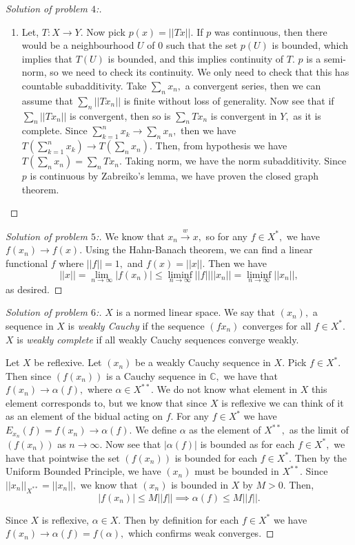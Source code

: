 \documentclass[letterpaper,11pt,twoside]{article}
\theoremstyle{proposition}
\theoremstyle{definition}
\theoremstyle{theorem}
\theoremstyle{definition}
\theoremstyle{definition}
\theoremstyle{definition}
\theoremstyle{lemma}
\theoremstyle{definition}
\theoremstyle{definition}
\theoremstyle{corollary}
\theoremstyle{definition}
\theoremstyle{definition}
\theoremstyle{definition}
\newcommand{\abs}[1]{\left \vert #1 \right \vert}
\newcommand{\norm}[1]{\left \vert \left \vert #1 \right \vert \right \vert}
\begin{document}
\begin{proof}[Solution of problem $4$:]
\begin{enumerate}
\begin{enumerate}
 		\item Let, $T:X \to Y.$ Now pick $p(x) = \norm{Tx}.$ If $p$ was continuous, then there would be a neighbourhood $U$ of $0$ such that the set $p(U)$ 
 		is bounded, which implies that $T(U)$ is bounded, and this implies continuity of $T.$ $p$ is a semi-norm, so we need to check its continuity. We 
 		only need to check that this has countable subadditivity. Take $\sum_n x_n,$ a convergent series, then we can assume that $ \sum_n \norm{Tx_n}$ is 
 		finite without loss of generality. Now see that if $\sum_n \norm{Tx_n}$ is convergent, then so is $\sum_n Tx_n$ is convergent in $Y,$ as it is 
 		complete. Since $\sum_{k=1}^{n}x_k \to \sum_n x_n,$ then we have $T \left( \sum_{k=1}^{n}x_k \right) \to T \left( \sum_n x_n \right).$ Then, from 
 		hypothesis we have $ T\left( \sum_n x_n \right)= \sum_n Tx_n.$ Taking norm, we have the norm subadditivity. Since $p$ is continuous by Zabreiko's 
 		lemma, we have proven the closed graph theorem. 
 	\end{enumerate}
 \end{enumerate}
\end{proof}
\begin{proof}[Solution of problem $5$:]
	We know that $x_n \xrightarrow{w} x,$ so for any $f \in X^*,$ we have $f(x_n) \to f(x).$ 
	Using the Hahn-Banach theorem, we can find a linear functional $f$ where $\norm{f}=1,$ and $f(x)= \norm{x}.$ 
	Then we have $$\norm{x}= \lim_{n \to \infty} \abs{f(x_n)}  \leq \liminf_{n \to \infty} \norm{f}\norm{x_n} = \liminf_{n \to \infty}\norm{x_n}, $$
	as desired.
\end{proof}
\begin{proof}[Solution of problem $6$:]
	$X$ is a normed linear space. We say that $(x_n),$ a sequence in $X$ is \textit{weakly Cauchy} if the sequence $(fx_n)$ converges for all $f \in X^*.$ 
	$X$ is \textit{weakly complete} if all weakly Cauchy sequences converge weakly. 
	
	Let $X$ be reflexive. Let $(x_n)$ be a weakly Cauchy sequence in $X.$ Pick $f \in X^*.$ Then since $ (f(x_n))$ is a Cauchy sequence in $\mathbb{C},$ we 
	have that $f(x_n) \to \alpha(f),$ where $\alpha \in X^{**}.$ We do not know what element in $X$ this element corresponds to, but we know that since $X$ 
	is reflexive we can think of it as an element of the bidual acting on $f.$ For any $f \in X^*$ we have $E_{x_n}(f) = f(x_n) \to \alpha(f).$ We define 
	$\alpha$ as the element of $X^{**},$ as the limit of $(f(x_n))$ as $n \to \infty.$ Now see that $\abs{\alpha(f)}$ is bounded as for each $f \in X^*,$ we 
	have that pointwise the set $(f(x_n))$ is bounded for each $f \in X^{*}.$ Then by the Uniform Bounded Principle, we have $(x_n)$ must be bounded in 
	$X^{**}.$ Since $\norm{x_n}_{X^{**}}= \norm{x_n},$ we know that $(x_n)$ is bounded in $X$ by $M>0.$ 
	Then, $$\abs{f(x_n)} \leq M \norm{f} \implies \alpha(f) \leq M \norm{f}.$$
	
	Since $X$ is reflexive, $\alpha \in X.$ Then by definition for each $f \in X^{*}$ we have $f(x_n) \to \alpha(f)=f(\alpha),$ which confirms weak 
	converges. 
\end{proof}
\end{document}
